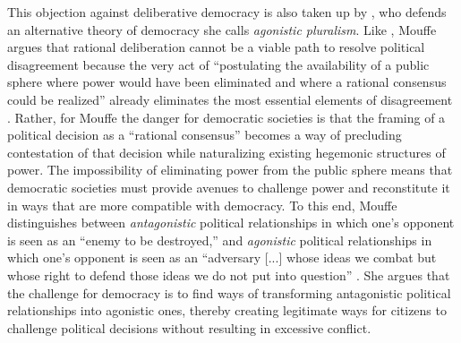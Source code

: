 This objection against deliberative democracy is also taken up by \citet{Mouffe2000DemocraticParadox}, who defends an alternative theory of democracy she calls \textit{agonistic pluralism}. Like \citet{LazarAndManuali2026LLMsDemocracy}, Mouffe argues that rational deliberation cannot be a viable path to resolve political disagreement because the very act of ``postulating the availability of a public sphere where power would have been eliminated and where a rational consensus could be realized'' already eliminates the most essential elements of disagreement \cite{Mouffe2000DemocraticParadox}. Rather, for Mouffe the danger for democratic societies is that the framing of a political decision as a ``rational consensus'' becomes a way of precluding contestation of that decision while naturalizing existing hegemonic structures of power. The impossibility of eliminating power from the public sphere means that democratic societies must provide avenues to challenge power and reconstitute it in ways that are more compatible with democracy. To this end, Mouffe distinguishes between \textit{antagonistic} political relationships in which one's opponent is seen as an ``enemy to be destroyed,'' and \textit{agonistic} political relationships in which one's opponent is seen as an ``adversary [...] whose ideas we combat but whose right to defend those ideas we do not put into question'' \cite{Mouffe2000DemocraticParadox}. She argues that the challenge for democracy is to find ways of transforming antagonistic political relationships into agonistic ones, thereby creating legitimate ways for citizens to challenge political decisions without resulting in excessive conflict.

